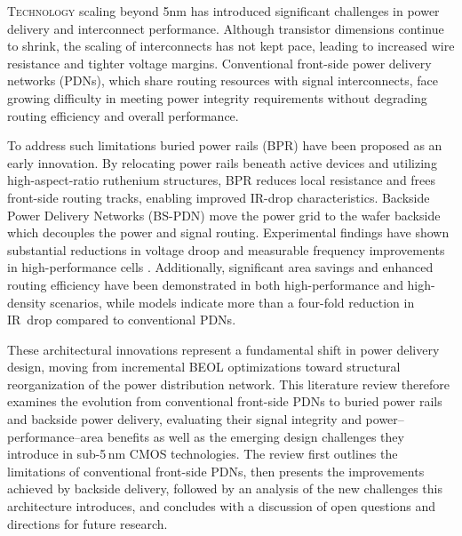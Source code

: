 \lettrine{T}{echnology} scaling beyond 5nm has introduced significant challenges in power delivery and interconnect performance. Although transistor dimensions continue to shrink, the scaling of interconnects has not kept pace, leading to increased wire resistance and tighter voltage margins. Conventional front-side power delivery networks (PDNs), which share routing resources with signal interconnects, face growing difficulty in meeting power integrity requirements without degrading routing efficiency and overall performance\cite{8993617}.

To address such limitations buried power rails (BPR) have been proposed as an early innovation. By relocating power rails beneath active devices and utilizing high-aspect-ratio ruthenium structures, BPR reduces local resistance and frees front-side routing tracks, enabling improved IR-drop characteristics\cite{8993617}. Backside Power Delivery Networks (BS-PDN) move the power grid to the wafer backside which decouples the power and signal routing\cite{10185208}. Experimental findings have shown substantial reductions in voltage droop and measurable frequency improvements in high-performance cells \cite{10185208}. Additionally, significant area savings and enhanced routing efficiency have been demonstrated in both high-performance and high-density scenarios\cite{10631463}, while models indicate more than a four-fold reduction in IR~drop compared to conventional PDNs\cite{8932458}.

These architectural innovations represent a fundamental shift in power delivery design, moving from incremental BEOL optimizations toward structural reorganization of the power distribution network. This literature review therefore examines the evolution from conventional front-side PDNs to buried power rails and backside power delivery, evaluating their signal integrity and power--performance--area benefits as well as the emerging design challenges they introduce in sub-5\,nm CMOS technologies. The review first outlines the limitations of conventional front-side PDNs, then presents the improvements achieved by backside delivery, followed by an analysis of the new challenges this architecture introduces, and concludes with a discussion of open questions and directions for future research.